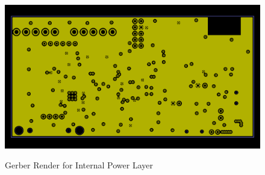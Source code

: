 \begin{figure}
\begin{center}
	\label{fig:PWRGerber}
	\includegraphics[angle=0,scale=1,width=.8\textwidth]{Images/Rev5_PWRGERB.png} 
	\caption{Gerber Render for Internal Power Layer}
\end{center}
\end{figure}
